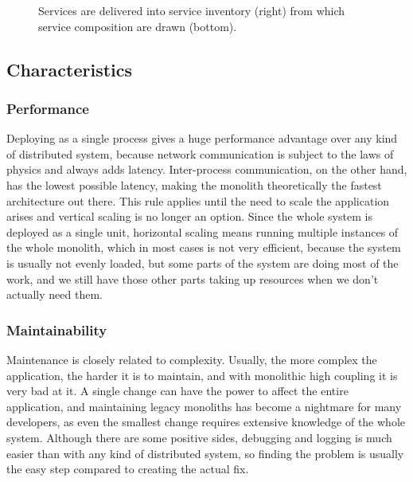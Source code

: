 \begin{figure}
    \centering
    
    \caption{Services are delivered into service inventory (right) from which service composition are drawn (bottom). \label{img:soa_architecture}}
\end{figure}



\subsection{Characteristics}

\subsubsection{Performance}
\label{section:monolith:performance}
Deploying as a single process gives a huge performance advantage over any kind of distributed system, because network communication is subject to the laws of physics and always adds latency. Inter-process communication, on the other hand, has the lowest possible latency, making the monolith theoretically the fastest architecture out there. This rule applies until the need to scale the application arises and vertical scaling is no longer an option. Since the whole system is deployed as a single unit, horizontal scaling means running multiple instances of the whole monolith, which in most cases is not very efficient, because the system is usually not evenly loaded, but some parts of the system are doing most of the work, and we still have those other parts taking up resources when we don't actually need them.


% 

\subsubsection{Maintainability}
Maintenance is closely related to complexity. Usually, the more complex the application, the harder it is to maintain, and with monolithic high coupling it is very bad at it. A single change can have the power to affect the entire application, and maintaining legacy monoliths has become a nightmare for many developers, as even the smallest change requires extensive knowledge of the whole system. Although there are some positive sides, debugging and logging is much easier than with any kind of distributed system, so finding the problem is usually the easy step compared to creating the actual fix.

